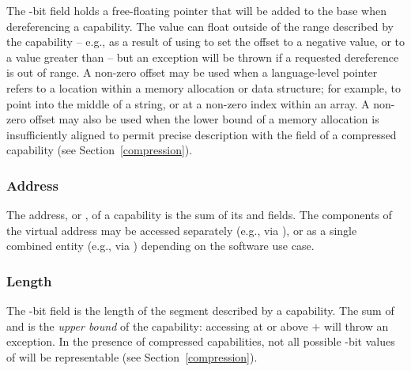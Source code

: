 The \xlen{}-bit \coffset{} field holds a free-floating pointer that will be
added to the base when dereferencing a capability.
The value can float outside of the range described by the capability -- e.g.,
as a result of using  to set the offset to a negative
value, or to a value greater than \clength{} -- but an exception will be
thrown if a requested dereference is out of range.
A non-zero offset may be used when a language-level pointer refers to a
location within a memory allocation or data structure; for example, to point
into the middle of a string, or at a non-zero index within an array.
A non-zero offset may also be used when the lower bound of a memory allocation
is insufficiently aligned to permit precise description with the \cbase{}
field of a compressed capability (see Section~\ref{compression}).

\subsubsection{Address}

The address, or \ccursor{}, of a capability is the sum of its
\cbase{} and \coffset{} fields.
The components of the virtual address may be accessed separately (e.g., via
), or as a single combined entity (e.g., via
) depending on the software
use case.


\subsubsection{Length}

The \xlen{}-bit \clength{} field is the length of the segment described by a
capability.
The sum of \cbase{} and \clength{} is the \textit{upper bound} of the
capability: accessing at or above \cbase{} $+$ \clength{} will throw an
exception.
In the presence of compressed capabilities, not all possible \xlen{}-bit
values of \clength{} will be representable (see Section~\ref{compression}).

